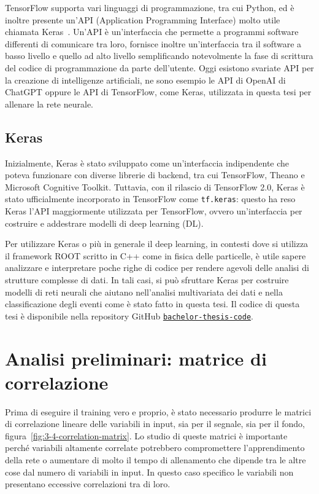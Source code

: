         TensorFlow supporta vari linguaggi di programmazione, tra cui Python, ed è inoltre presente un’API (Application Programming Interface) molto utile chiamata Keras~\cite{Keras}. Un’API è un’interfaccia che permette a programmi software differenti di comunicare tra loro, fornisce inoltre un’interfaccia tra il software a basso livello e quello ad alto livello semplificando notevolmente la fase di scrittura del codice di programmazione da parte dell’utente. Oggi esistono svariate API per la creazione di intelligenze artificiali, ne sono esempio le API di OpenAI di ChatGPT oppure le API di TensorFlow, come Keras, utilizzata in questa tesi per allenare la rete neurale.

    \subsection{Keras}
        Inizialmente, Keras è stato sviluppato come un’interfaccia indipendente che poteva funzionare con diverse librerie di backend, tra cui TensorFlow, Theano e Microsoft Cognitive Toolkit. Tuttavia, con il rilascio di TensorFlow 2.0, Keras è stato ufficialmente incorporato in TensorFlow come \texttt{tf.keras}: questo ha reso Keras l’API maggiormente utilizzata per TensorFlow, ovvero un’interfaccia per costruire e addestrare modelli di deep learning (DL).

        Per utilizzare Keras o più in generale il deep learning, in contesti dove si utilizza il framework ROOT scritto in C++ come in fisica delle particelle, è utile sapere analizzare e interpretare poche righe di codice per rendere agevoli delle analisi di strutture complesse di dati. In tali casi, si può sfruttare Keras per costruire modelli di reti neurali che aiutano nell’analisi multivariata dei dati e nella classificazione degli eventi come è stato fatto in questa tesi. Il codice di questa tesi è disponibile nella repository GitHub \href{https://github.com/giopedro92/bachelor-thesis-code}{\texttt{bachelor-thesis-code}}.

\section{Analisi preliminari: matrice di correlazione}
    Prima di eseguire il training vero e proprio, è stato necessario produrre le matrici di correlazione lineare delle variabili in input, sia per il segnale, sia per il fondo, figura~\ref{fig:3-4-correlation-matrix}. Lo studio di queste matrici è importante perché variabili altamente correlate potrebbero compromettere l'apprendimento della rete o aumentare di molto il tempo di allenamento che dipende tra le altre cose dal numero di variabili in input. In questo caso specifico le variabili non presentano eccessive correlazioni tra di loro.

